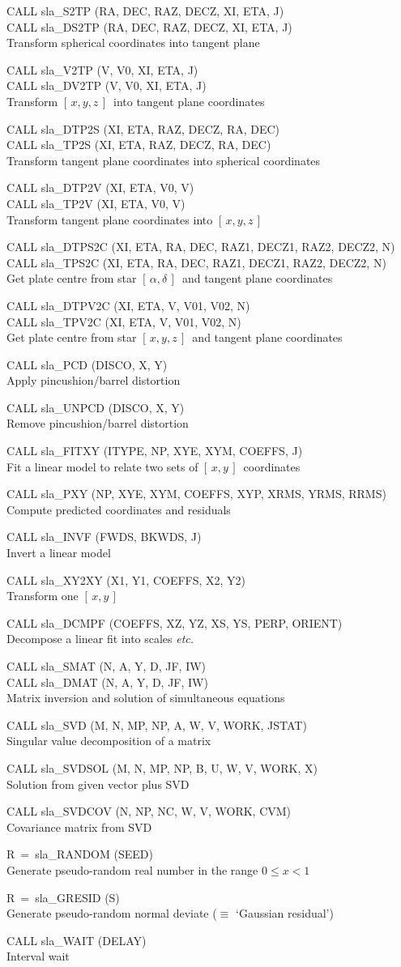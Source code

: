 \documentclass[11pt,twoside]{article}
\newcommand{\radec}     {$[\,\alpha,\delta\,]$}
\newcommand{\xy}        {$[\,x,y\,]$}
\newcommand{\xyz}       {$[\,x,y,z\,]$}
\newcommand{\callhead}[1]{\goodbreak\vspace{\bigskipamount}{\large\bf{#1}}}
\newenvironment{callset}{\begin{list}{}{\setlength{\leftmargin}{2cm}
                             \setlength{\parsep}{\smallskipamount}}}{\end{list}}
\newcommand{\subp}[1]{\item\hspace{-1cm}#1\\}
\newcommand{\subq}[2]{\item\hspace{-1cm}#1\\\hspace*{-1cm}#2\\}
\begin{document}
\callhead{Astrometry}
\begin{callset}
\subq{CALL sla\_S2TP (RA, DEC, RAZ, DECZ, XI, ETA, J)}
     {CALL sla\_DS2TP (RA, DEC, RAZ, DECZ, XI, ETA, J)}
   Transform spherical coordinates into tangent plane
\subq{CALL sla\_V2TP (V, V0, XI, ETA, J)}
     {CALL sla\_DV2TP (V, V0, XI, ETA, J)}
   Transform \xyz\ into tangent plane coordinates
\subq{CALL sla\_DTP2S (XI, ETA, RAZ, DECZ, RA, DEC)}
     {CALL sla\_TP2S (XI, ETA, RAZ, DECZ, RA, DEC)}
   Transform tangent plane coordinates into spherical coordinates
\subq{CALL sla\_DTP2V (XI, ETA, V0, V)}
     {CALL sla\_TP2V (XI, ETA, V0, V)}
   Transform tangent plane coordinates into \xyz
\subq{CALL sla\_DTPS2C (XI, ETA, RA, DEC, RAZ1, DECZ1, RAZ2, DECZ2, N)}
     {CALL sla\_TPS2C (XI, ETA, RA, DEC, RAZ1, DECZ1, RAZ2, DECZ2, N)}
   Get plate centre from star \radec\ and tangent plane coordinates
\subq{CALL sla\_DTPV2C (XI, ETA, V, V01, V02, N)}
     {CALL sla\_TPV2C (XI, ETA, V, V01, V02, N)}
   Get plate centre from star \xyz\ and tangent plane coordinates
\subp{CALL sla\_PCD (DISCO, X, Y)}
   Apply pincushion/barrel distortion
\subp{CALL sla\_UNPCD (DISCO, X, Y)}
   Remove pincushion/barrel distortion
\subp{CALL sla\_FITXY (ITYPE, NP, XYE, XYM, COEFFS, J)}
   Fit a linear model to relate two sets of \xy\ coordinates
\subp{CALL sla\_PXY (NP, XYE, XYM, COEFFS, XYP, XRMS, YRMS, RRMS)}
   Compute predicted coordinates and residuals
\subp{CALL sla\_INVF (FWDS, BKWDS, J)}
   Invert a linear model
\subp{CALL sla\_XY2XY (X1, Y1, COEFFS, X2, Y2)}
   Transform one \xy
\subp{CALL sla\_DCMPF (COEFFS, XZ, YZ, XS, YS, PERP, ORIENT)}
   Decompose a linear fit into scales {\it etc.}
\end{callset}

\callhead{Numerical Methods}
\begin{callset}
\subq{CALL sla\_SMAT (N, A, Y, D, JF, IW)}
     {CALL sla\_DMAT (N, A, Y, D, JF, IW)}
   Matrix inversion and solution of simultaneous equations
\subp{CALL sla\_SVD (M, N, MP, NP, A, W, V, WORK, JSTAT)}
   Singular value decomposition of a matrix
\subp{CALL sla\_SVDSOL (M, N, MP, NP, B, U, W, V, WORK, X)}
   Solution from given vector plus SVD
\subp{CALL sla\_SVDCOV (N, NP, NC, W, V, WORK, CVM)}
   Covariance matrix from SVD
\subp{R~=~sla\_RANDOM (SEED)}
   Generate pseudo-random real number in the range {$0 \leq x < 1$}
\subp{R~=~sla\_GRESID (S)}
   Generate pseudo-random normal deviate ($\equiv$ `Gaussian residual')
\end{callset}

\callhead{Real-time}
\begin{callset}
\subp{CALL sla\_WAIT (DELAY)}
    Interval wait
\end{callset}
\end{document}
